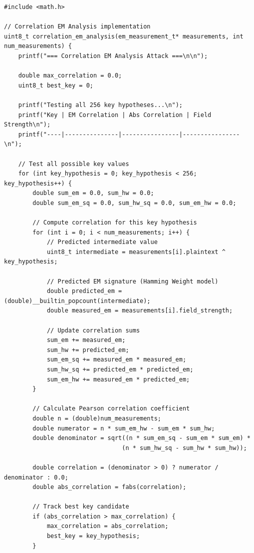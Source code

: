 \documentclass[11pt,a4paper]{article}
\theoremstyle{definition}
\begin{document}
\begin{lstlisting}[caption={Complete EM Attack Implementation}]
#include <math.h>

// Correlation EM Analysis implementation
uint8_t correlation_em_analysis(em_measurement_t* measurements, int num_measurements) {
    printf("=== Correlation EM Analysis Attack ===\n\n");
    
    double max_correlation = 0.0;
    uint8_t best_key = 0;
    
    printf("Testing all 256 key hypotheses...\n");
    printf("Key | EM Correlation | Abs Correlation | Field Strength\n");
    printf("----|---------------|----------------|----------------\n");
    
    // Test all possible key values
    for (int key_hypothesis = 0; key_hypothesis < 256; key_hypothesis++) {
        double sum_em = 0.0, sum_hw = 0.0;
        double sum_em_sq = 0.0, sum_hw_sq = 0.0, sum_em_hw = 0.0;
        
        // Compute correlation for this key hypothesis
        for (int i = 0; i < num_measurements; i++) {
            // Predicted intermediate value
            uint8_t intermediate = measurements[i].plaintext ^ key_hypothesis;
            
            // Predicted EM signature (Hamming Weight model)
            double predicted_em = (double)__builtin_popcount(intermediate);
            double measured_em = measurements[i].field_strength;
            
            // Update correlation sums
            sum_em += measured_em;
            sum_hw += predicted_em;
            sum_em_sq += measured_em * measured_em;
            sum_hw_sq += predicted_em * predicted_em;
            sum_em_hw += measured_em * predicted_em;
        }
        
        // Calculate Pearson correlation coefficient
        double n = (double)num_measurements;
        double numerator = n * sum_em_hw - sum_em * sum_hw;
        double denominator = sqrt((n * sum_em_sq - sum_em * sum_em) * 
                                 (n * sum_hw_sq - sum_hw * sum_hw));
        
        double correlation = (denominator > 0) ? numerator / denominator : 0.0;
        double abs_correlation = fabs(correlation);
        
        // Track best key candidate
        if (abs_correlation > max_correlation) {
            max_correlation = abs_correlation;
            best_key = key_hypothesis;
        }
        

\end{lstlisting}
\end{document}
